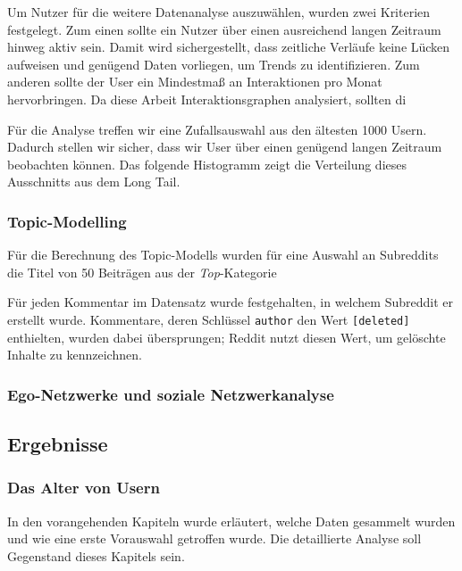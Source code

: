 \documentclass[11pt,a4paper,twoside]{article}
\begin{document}
Um Nutzer für die weitere Datenanalyse auszuwählen, wurden zwei
Kriterien festgelegt. Zum einen sollte ein Nutzer über einen ausreichend
langen Zeitraum hinweg aktiv sein. Damit wird sichergestellt, dass
zeitliche Verläufe keine Lücken aufweisen und genügend Daten vorliegen,
um Trends zu identifizieren. Zum anderen sollte der User ein Mindestmaß
an Interaktionen pro Monat hervorbringen. Da diese Arbeit
Interaktionsgraphen analysiert, sollten di

Für die Analyse treffen wir eine Zufallsauswahl aus den ältesten 1000
Usern. Dadurch stellen wir sicher, dass wir User über einen genügend
langen Zeitraum beobachten können. Das folgende Histogramm zeigt die
Verteilung dieses Ausschnitts aus dem Long Tail.

\hypertarget{topic-modelling}{%
\subsubsection{Topic-Modelling}\label{topic-modelling}}

Für die Berechnung des Topic-Modells wurden für eine Auswahl an
Subreddits die Titel von 50 Beiträgen aus der \emph{Top}-Kategorie

Für jeden Kommentar im Datensatz wurde festgehalten, in welchem
Subreddit er erstellt wurde. Kommentare, deren Schlüssel \texttt{author}
den Wert \texttt{{[}deleted{]}} enthielten, wurden dabei übersprungen;
Reddit nutzt diesen Wert, um gelöschte Inhalte zu kennzeichnen.

\hypertarget{ego-netzwerke-und-soziale-netzwerkanalyse}{%
\subsubsection{Ego-Netzwerke und soziale
Netzwerkanalyse}\label{ego-netzwerke-und-soziale-netzwerkanalyse}}

\hypertarget{ergebnisse}{%
\subsection{Ergebnisse}\label{ergebnisse}}

\hypertarget{das-alter-von-usern}{%
\subsubsection{Das Alter von Usern}\label{das-alter-von-usern}}

In den vorangehenden Kapiteln wurde erläutert, welche Daten gesammelt
wurden und wie eine erste Vorauswahl getroffen wurde. Die detaillierte
Analyse soll Gegenstand dieses Kapitels sein.
\end{document}
